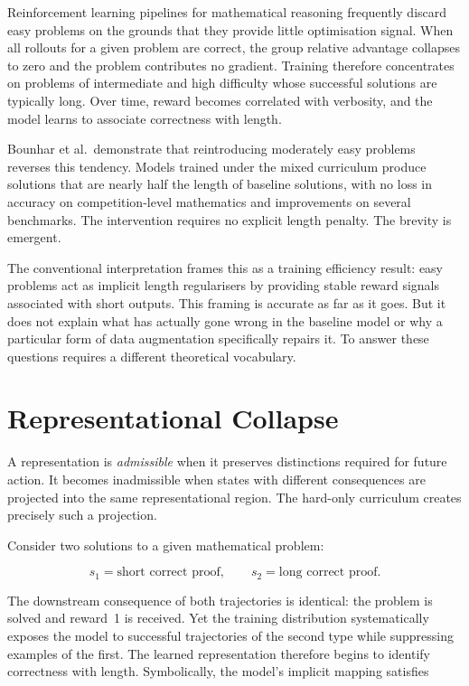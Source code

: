 \documentclass[11pt]{article}
\theoremstyle{rthm}
\theoremstyle{rdef}
\theoremstyle{remark}
\begin{document}
Reinforcement learning pipelines for mathematical reasoning frequently
discard easy problems on the grounds that they provide little optimisation
signal. When all rollouts for a given problem are correct, the group
relative advantage collapses to zero and the problem contributes no
gradient. Training therefore concentrates on problems of intermediate
and high difficulty whose successful solutions are typically long. Over
time, reward becomes correlated with verbosity, and the model learns to
associate correctness with length.

Bounhar et al.\ demonstrate that reintroducing moderately easy problems
reverses this tendency. Models trained under the mixed curriculum produce
solutions that are nearly half the length of baseline solutions, with
no loss in accuracy on competition-level mathematics and improvements
on several benchmarks. The intervention requires no explicit length
penalty. The brevity is emergent.

The conventional interpretation frames this as a training efficiency
result: easy problems act as implicit length regularisers by providing
stable reward signals associated with short outputs. This framing is
accurate as far as it goes. But it does not explain what has actually
gone wrong in the baseline model or why a particular form of data
augmentation specifically repairs it. To answer these questions requires
a different theoretical vocabulary.

\section{Representational Collapse}
\label{sec:collapse}

A representation is \emph{admissible} when it preserves distinctions
required for future action. It becomes inadmissible when states with
different consequences are projected into the same representational
region. The hard-only curriculum creates precisely such a projection.

Consider two solutions to a given mathematical problem:

\[
s_1 = \text{short correct proof}, \qquad s_2 = \text{long correct proof}.
\]

The downstream consequence of both trajectories is identical: the
problem is solved and reward~1 is received. Yet the training distribution
systematically exposes the model to successful trajectories of the
second type while suppressing examples of the first. The learned
representation therefore begins to identify correctness with length.
Symbolically, the model's implicit mapping satisfies
\end{document}
